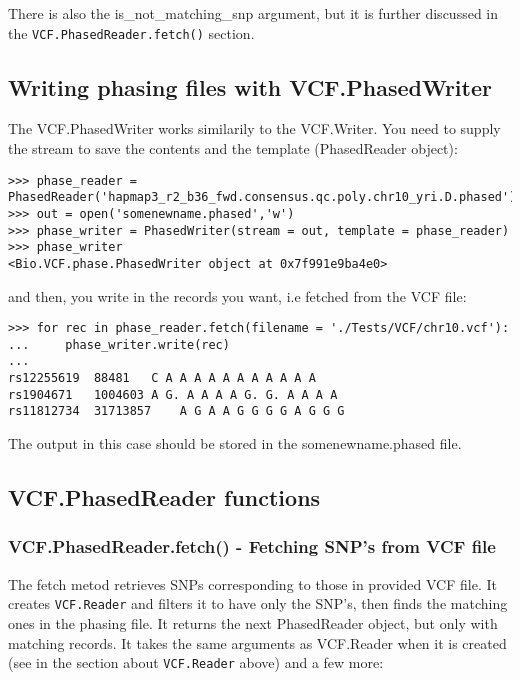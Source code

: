 \noindent There is also the is\_not\_matching\_snp argument, but it is further discussed in the \verb|VCF.PhasedReader.fetch()|
section.

\subsection{Writing phasing files with VCF.PhasedWriter}

\noindent The VCF.PhasedWriter works similarily to the VCF.Writer. You need to supply the stream to save the contents and
the template (PhasedReader object):

\begin{verbatim}
>>> phase_reader = PhasedReader('hapmap3_r2_b36_fwd.consensus.qc.poly.chr10_yri.D.phased')
>>> out = open('somenewname.phased','w')
>>> phase_writer = PhasedWriter(stream = out, template = phase_reader)
>>> phase_writer
<Bio.VCF.phase.PhasedWriter object at 0x7f991e9ba4e0>
\end{verbatim}

\noindent and then, you write in the records you want, i.e fetched from the VCF file:

\begin{verbatim}
>>> for rec in phase_reader.fetch(filename = './Tests/VCF/chr10.vcf'):
...     phase_writer.write(rec)
...
rs12255619	88481	C A A A A A A A A A A A
rs1904671	1004603	A G. A A A A G. G. A A A A
rs11812734	31713857	A G A A G G G G A G G G

\end{verbatim}

\noindent The output in this case should be stored in the somenewname.phased file.

\subsection{VCF.PhasedReader functions}

\subsubsection{VCF.PhasedReader.fetch() - Fetching SNP's from VCF file}

\noindent The fetch metod retrieves SNPs corresponding to those in provided VCF file. It creates \verb|VCF.Reader|
and filters it to have only the SNP's, then finds the matching ones in the phasing file. It returns the next PhasedReader object, but only with matching records.
It takes the same arguments as VCF.Reader when it is created (see in the section about \verb|VCF.Reader| above) and a few more:

